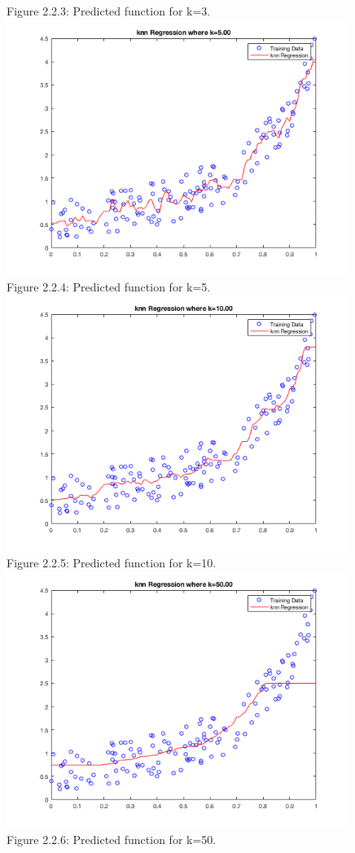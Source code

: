 \documentclass[]{scrreprt}   %
\begin{document}
\begin{center}
	{Figure 2.2.3: Predicted function for k=3.}
	\includegraphics[width=30em,keepaspectratio]{p2figure4.png}\\
	{Figure 2.2.4: Predicted function for k=5.}
	\includegraphics[width=30em,keepaspectratio]{p2figure5.png}\\
	{Figure 2.2.5: Predicted function for k=10.}
	\includegraphics[width=30em,keepaspectratio]{p2figure6.png}\\
	{Figure 2.2.6: Predicted function for k=50.}
\end{center} 
\end{document}
